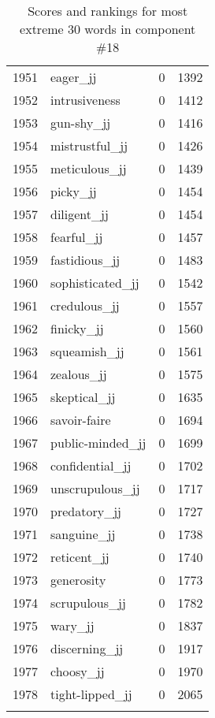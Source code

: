\begin{longtable}[!htbp]{| rlr@{.}l |}
    1951 & eager\_jj & 0 & 1392 \\
    1952 & intrusiveness & 0 & 1412 \\
    1953 & gun-shy\_jj & 0 & 1416 \\
    1954 & mistrustful\_jj & 0 & 1426 \\
    1955 & meticulous\_jj & 0 & 1439 \\
    1956 & picky\_jj & 0 & 1454 \\
    1957 & diligent\_jj & 0 & 1454 \\
    1958 & fearful\_jj & 0 & 1457 \\
    1959 & fastidious\_jj & 0 & 1483 \\
    1960 & sophisticated\_jj & 0 & 1542 \\
    1961 & credulous\_jj & 0 & 1557 \\
    1962 & finicky\_jj & 0 & 1560 \\
    1963 & squeamish\_jj & 0 & 1561 \\
    1964 & zealous\_jj & 0 & 1575 \\
    1965 & skeptical\_jj & 0 & 1635 \\
    1966 & savoir-faire & 0 & 1694 \\
    1967 & public-minded\_jj & 0 & 1699 \\
    1968 & confidential\_jj & 0 & 1702 \\
    1969 & unscrupulous\_jj & 0 & 1717 \\
    1970 & predatory\_jj & 0 & 1727 \\
    1971 & sanguine\_jj & 0 & 1738 \\
    1972 & reticent\_jj & 0 & 1740 \\
    1973 & generosity & 0 & 1773 \\
    1974 & scrupulous\_jj & 0 & 1782 \\
    1975 & wary\_jj & 0 & 1837 \\
    1976 & discerning\_jj & 0 & 1917 \\
    1977 & choosy\_jj & 0 & 1970 \\
    1978 & tight-lipped\_jj & 0 & 2065 \\
    \hline
    \caption{Scores and rankings for most extreme 30 words in component \#18} \\
\end{longtable}
